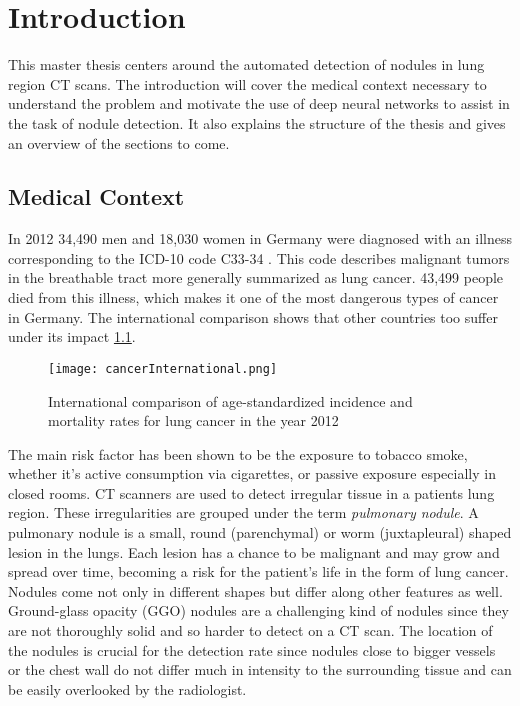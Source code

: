 \documentclass[main.tex]{subfiles}
\begin{document}
\chapter{Introduction}
This master thesis centers around the automated detection of nodules in lung region CT scans. The introduction will cover the medical context necessary to understand the problem and motivate the use of deep neural networks to assist in the task of nodule detection. It also explains the structure of the thesis and gives an overview of the sections to come.

\section{Medical Context}
In 2012 34,490 men and 18,030 women in Germany were diagnosed with an illness corresponding to the ICD-10 code C33-34 \cite{koch2015krebs}. This code describes malignant tumors in the breathable tract more generally summarized as lung cancer. 43,499 people died from this illness, which makes it one of the most dangerous types of cancer in Germany. The international comparison shows that other countries too suffer under its impact \ref{fig:cancInt}.

\begin{figure}[ht]
\texttt{[image: cancerInternational.png]}
\caption{International comparison of age-standardized incidence and mortality rates for lung cancer in the year 2012}
\label{fig:cancInt}
\end{figure}

The main risk factor has been shown to be the exposure to tobacco smoke, whether it's active consumption via cigarettes, or passive exposure especially in closed rooms. CT scanners are used to detect irregular tissue in a patients lung region. These irregularities are grouped under the term \textit{pulmonary nodule}. A pulmonary nodule is a small, round (parenchymal) or worm (juxtapleural) shaped lesion in the lungs. Each lesion has a chance to be malignant and may grow and spread over time, becoming a risk for the patient's life in the form of lung cancer. Nodules come not only in different shapes but differ along other features as well. Ground-glass opacity (GGO) nodules are a challenging kind of nodules since they are not thoroughly solid and so harder to detect on a CT scan. The location of the nodules is crucial for the detection rate since nodules close to bigger vessels or the chest wall do not differ much in intensity to the surrounding tissue and can be easily overlooked by the radiologist.
\end{document}
